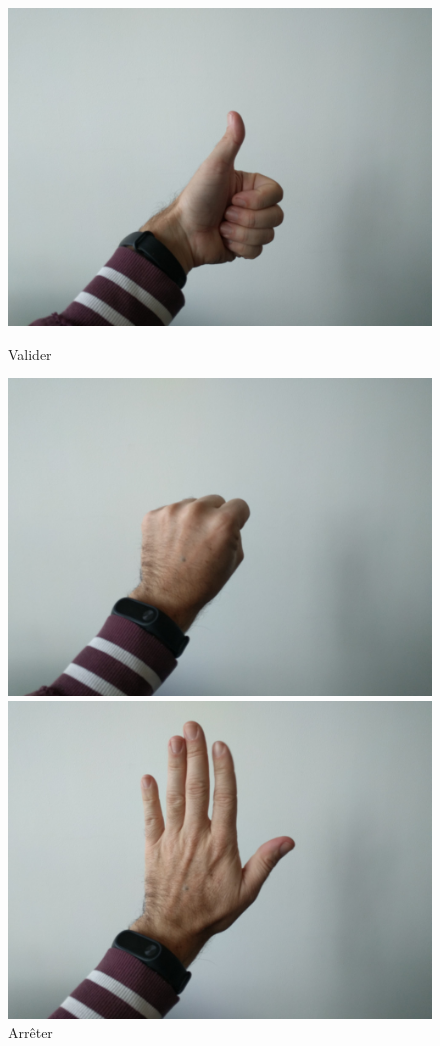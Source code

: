 \begin{figure}[!htb]
\begin{minipage}[c]{.32\linewidth}
		\includegraphics[width=\columnwidth]{figures/3.jpg}%
		\caption*{Valider}%
	\end{minipage}
	\centering
	\begin{minipage}[c]{.32\linewidth}
		\includegraphics[width=\columnwidth]{figures/4.jpg}%
		\caption*{Arrêter}%
	\end{minipage}
	\begin{minipage}[c]{.32\linewidth}
		\includegraphics[width=\columnwidth]{figures/5.jpg}%

\end{minipage}
\end{figure}
